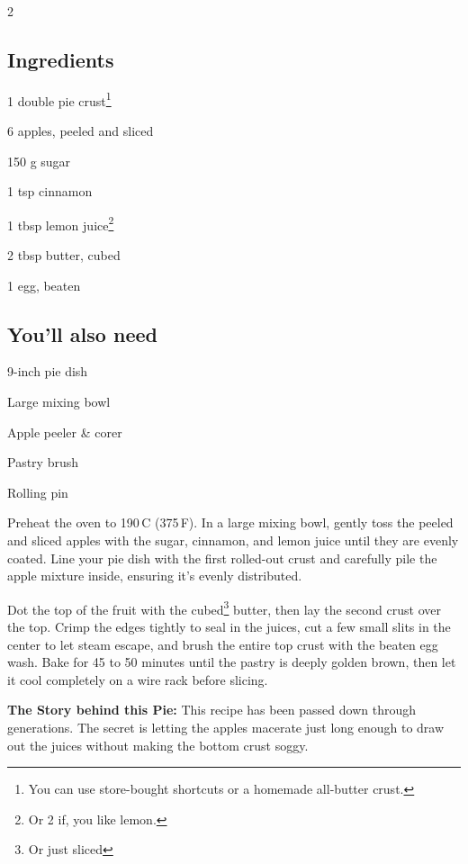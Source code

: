 \newpage
{}

\begin{multicols}{2}
	\subsection*{Ingredients}
	\begin{ingredients}
		\item 1 double pie crust\footnote{You can use store-bought shortcuts or a homemade all-butter crust.}
		\item 6 apples, peeled and sliced
		\item 150 g sugar
		\item 1 tsp cinnamon
		\item 1 tbsp lemon juice\footnote{Or 2 if, you like lemon.}
		\item 2 tbsp butter, cubed
		\item 1 egg, beaten
	\end{ingredients}
	
	\columnbreak
	
	\subsection*{You'll also need}
	\begin{equipment}
		\item 9-inch pie dish
		\item Large mixing bowl
		\item Apple peeler \& corer
		\item Pastry brush
		\item Rolling pin
	\end{equipment}
\end{multicols}

\medskip

Preheat the oven to 190\,\textdegree C (375\,\textdegree F). In a large mixing bowl, gently toss the peeled and sliced apples with the sugar, cinnamon, and lemon juice until they are evenly coated. Line your pie dish with the first rolled-out crust and carefully pile the apple mixture inside, ensuring it's evenly distributed. 

Dot the top of the fruit with the cubed\footnote{Or just sliced} butter, then lay the second crust over the top. Crimp the edges tightly to seal in the juices, cut a few small slits in the center to let steam escape, and brush the entire top crust with the beaten egg wash. Bake for 45 to 50 minutes until the pastry is deeply golden brown, then let it cool completely on a wire rack before slicing.

\vspace*{0.75 cm}

\begin{recipeblock}
	\noindent\textbf{The Story behind this Pie:} This recipe has been passed down through generations. The secret is letting the apples macerate just long enough to draw out the juices without making the bottom crust soggy.
\end{recipeblock}